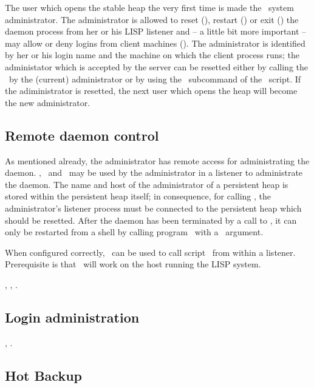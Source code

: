 The user which opens the stable heap the very first time is made the
\plob\ system administrator. The administrator is allowed to reset
(), restart () or exit
() the daemon process from her or his LISP listener and
-- a little bit more important -- may allow or deny logins from client
machines (). The administrator is
identified by her or his login name and the machine on which the
client process runs; the administator which is accepted by the server
can be resetted either by calling the \ by the
(current) administrator or by using the \ subcommand of
the \ script. If the adiministrator is resetted, the
next user which opens the heap will become the new administrator.

\subsection{Remote daemon control}%
\label{sec:RemoteDaemonControl}

As mentioned already, the administrator has remote access for
administrating the daemon. , \ and
\ may be used by the administrator in a listener to
administrate the daemon. The name and host of the administrator of a
persistent heap is stored within the persistent heap itself; in
consequence, for calling , the administrator's listener
process must be connected to the persistent heap which should be
resetted. After the daemon has been terminated by a call to
, it can only be restarted from a shell by calling
program \ with a \ argument.

When configured correctly, \ can be used to call
script \ from within a listener. Prerequisite is that
\ will work on the host running the LISP system.

 {}, , .

\subsection{Login administration}

 {}, .

\subsection{Hot Backup}%
\label{sec:HotBackup}

